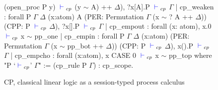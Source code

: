 \begin{figure}
\begin{coq}
                          (open_proc P y) ${\color{blue} {} \vdash {}}_{cp}$ (y $\sim$ A) ++ $\Delta$),
                 ?x[A].P ${\color{blue} {} \vdash {}}_{cp}$ $\Gamma$
  | cp_weaken : forall P $\Gamma$ $\Delta$ (x:atom) A
                       (PER: Permutation $\Gamma$ (x $\sim$ ? A ++ $\Delta$))
                       (CPP: P ${\color{blue} {} \vdash {}}_{cp}$ $\Delta$),
                  ?x[].P ${\color{blue} {} \vdash {}}_{cp}$ $\Gamma$
  | cp_empout : forall (x: atom), x.0 ${\color{blue} {} \vdash {}}_{cp}$ x $\sim$ pp_one
  | cp_empin : forall P $\Gamma$ $\Delta$ (x:atom)
                      (PER: Permutation $\Gamma$ (x $\sim$ pp_bot ++ $\Delta$))
                      (CPP: P ${\color{blue} {} \vdash {}}_{cp}$ $\Delta$),
                 x().P ${\color{blue} {} \vdash {}}_{cp}$ $\Gamma$
  | cp_empcho : forall (x:atom), x CASE 0 ${\color{blue} {} \vdash {}}_{cp}$ x $\sim$ pp_top
where "P `${\color{blue} {} \vdash {}}_{cp}$' $\Gamma$" := (cp_rule P $\Gamma$) : cp_scope.
\end{coq}
\caption{CP, classical linear logic as a session-typed process calculus}
\label{fig:cll}
\end{figure}
